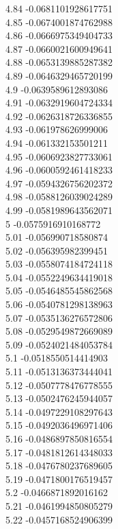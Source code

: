 {4.84	-0.0681101928617751\\
4.85	-0.0674001874762988\\
4.86	-0.0666975349404733\\
4.87	-0.0660021600949641\\
4.88	-0.0653139885287382\\
4.89	-0.0646329465720199\\
4.9	-0.0639589612893086\\
4.91	-0.0632919604724334\\
4.92	-0.0626318726336855\\
4.93	-0.061978626999006\\
4.94	-0.061332153501211\\
4.95	-0.0606923827733061\\
4.96	-0.0600592461418233\\
4.97	-0.0594326756202372\\
4.98	-0.0588126039024289\\
4.99	-0.0581989643562071\\
5	-0.0575916910168772\\
5.01	-0.056990718580874\\
5.02	-0.056395982399451\\
5.03	-0.0558074184724118\\
5.04	-0.0552249634419018\\
5.05	-0.0546485545862568\\
5.06	-0.0540781298138963\\
5.07	-0.0535136276572806\\
5.08	-0.0529549872669089\\
5.09	-0.0524021484053784\\
5.1	-0.0518550514414903\\
5.11	-0.0513136373444041\\
5.12	-0.0507778476778555\\
5.13	-0.0502476245944057\\
5.14	-0.0497229108297643\\
5.15	-0.0492036496971406\\
5.16	-0.0486897850816554\\
5.17	-0.0481812614348033\\
5.18	-0.0476780237689605\\
5.19	-0.0471800176519457\\
5.2	-0.0466871892016162\\
5.21	-0.0461994850805279\\
5.22	-0.0457168524906399\\
}
